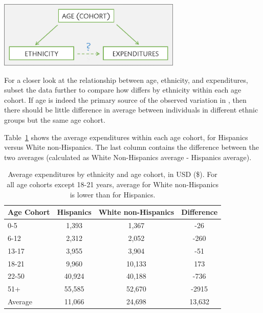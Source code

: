 \begin{center}
	\includegraphics[height=1.25in]{ch_intro_to_data_oi_biostat/figures/ddsConfounding/ddsConfounding.png}
\end{center}

For a closer look at the relationship between age, ethnicity, and expenditures, subset the data further to compare how  differs by ethnicity within each age cohort. If age is indeed the primary source of the observed variation in , then there should be little difference in average  between individuals in different ethnic groups but the same age cohort. 

Table~\ref{ddsAvgExpEthAge} shows the average expenditures within each age cohort, for Hispanics versus White non-Hispanics. The last column contains the difference between the two averages (calculated as White Non-Hispanics average - Hispanics average).

\begin{table}[ht]
	\centering
	\begin{tabular}{|l|c|c|c|}
		\hline
		Age Cohort & Hispanics & White non-Hispanics & Difference \\ 
		\hline
		0-5 & 1,393 & 1,367 & -26 \\ 
		6-12 & 2,312 & 2,052 & -260 \\ 
		13-17 & 3,955 & 3,904 & -51 \\ 
		\cellcolor{lightblue} 18-21 & \cellcolor{lightblue} 9,960 & \cellcolor{lightblue} 10,133 & \cellcolor{lightblue} 173 \\ 
		22-50 & 40,924 & 40,188 & -736 \\ 
		51+ & 55,585 & 52,670 & -2915 \\ 
		\hline
		Average & 11,066 & 24,698 & 13,632\\
		\hline
	\end{tabular}
	\caption{Average expenditures by ethnicity and age cohort, in USD (\$). For all age cohorts except 18-21 years, average  for White non-Hispanics is lower than for Hispanics.}
	\label{ddsAvgExpEthAge}
\end{table}

